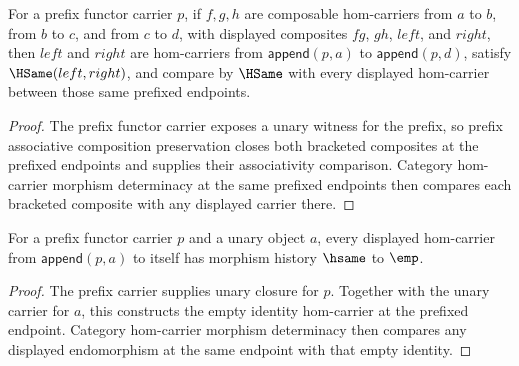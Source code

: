 \begin{theorem}
\label{thm:prefix-functor-carrier-comp-assoc-public-readback}
For a prefix functor carrier \(p\), if \(f,g,h\) are composable
hom-carriers from \(a\) to \(b\), from \(b\) to \(c\), and from \(c\) to
\(d\), with displayed composites \(fg\), \(gh\), \(left\), and \(right\),
then \(left\) and \(right\) are hom-carriers from
\(\mathsf{append}(p,a)\) to \(\mathsf{append}(p,d)\), satisfy
\(\HSame(left,right)\), and compare by \(\HSame\) with every displayed
hom-carrier between those same prefixed endpoints.
\end{theorem}
\begin{proof}
The prefix functor carrier exposes a unary witness for the prefix, so
prefix associative composition preservation closes both bracketed composites
at the prefixed endpoints and supplies their associativity comparison.
Category hom-carrier morphism determinacy at the same prefixed endpoints
then compares each bracketed composite with any displayed carrier there.
\end{proof}

\begin{theorem}
\label{thm:prefix-functor-carrier-identity-public-readback}
For a prefix functor carrier \(p\) and a unary object \(a\), every displayed
hom-carrier from \(\mathsf{append}(p,a)\) to itself has morphism history
\(\hsame\) to \(\emp\).
\end{theorem}
\begin{proof}
The prefix carrier supplies unary closure for \(p\). Together with the unary
carrier for \(a\), this constructs the empty identity hom-carrier at the
prefixed endpoint. Category hom-carrier morphism determinacy then compares
any displayed endomorphism at the same endpoint with that empty identity.
\end{proof}

